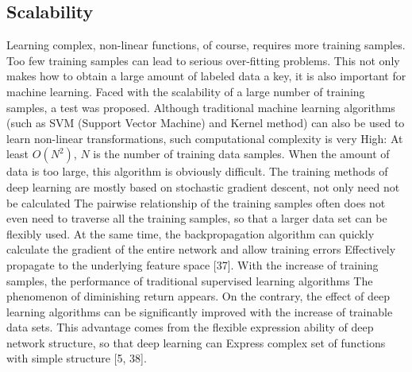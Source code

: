 \documentclass[11pt,en]{elegantpaper}
\begin{document}
\subsection{Scalability}
Learning complex, non-linear functions, of course, requires more training samples. Too few training samples can lead to serious over-fitting problems. This not only makes how to obtain a large amount of labeled data a key, it is also important for machine learning. Faced with the scalability of a large number of training samples, a test was proposed. Although traditional machine learning algorithms (such as SVM (Support Vector Machine) and Kernel method) can also be used to learn non-linear transformations, such computational complexity is very High: At least $O(N^2)$, $N$ is the number of training data samples. When the amount of data is too large, this algorithm is obviously difficult. The training methods of deep learning are mostly based on stochastic gradient descent, not only need not be calculated The pairwise relationship of the training samples often does not even need to traverse all the training samples, so that a larger data set can be flexibly used. At the same time, the backpropagation algorithm can quickly calculate the gradient of the entire network and allow training errors Effectively propagate to the underlying feature space [37]. With the increase of training samples, the performance of traditional supervised learning algorithms The phenomenon of diminishing return appears. On the contrary, the effect of deep learning algorithms can be significantly improved with the increase of trainable data sets. This advantage comes from the flexible expression ability of deep network structure, so that deep learning can Express complex set of functions with simple structure [5, 38].
\end{document}
